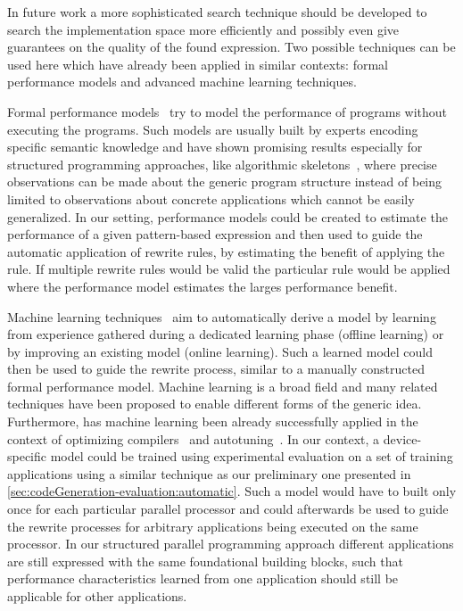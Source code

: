 In future work a more sophisticated search technique should be developed to search the implementation space more efficiently and possibly even give guarantees on the quality of the found expression.
Two possible techniques can be used here which have already been applied in similar contexts:
formal performance models and advanced machine learning techniques.

Formal performance models~\cite{} try to model the performance of programs without executing the programs.
Such models are usually built by experts encoding specific semantic knowledge and have shown promising results especially for structured programming approaches, like algorithmic skeletons~\cite{}, where precise observations can be made about the generic program structure instead of being limited to observations about concrete applications which cannot be easily generalized.
In our setting, performance models could be created to estimate the performance of a given pattern-based expression and then used to guide the automatic application of rewrite rules, by estimating the benefit of applying the rule.
If multiple rewrite rules would be valid the particular rule would be applied where the performance model estimates the larges performance benefit.

Machine learning techniques~\cite{} aim to automatically derive a model by learning from experience gathered during a dedicated learning phase (offline learning) or by improving an existing model (online learning).
Such a learned model could then be used to guide the rewrite process, similar to a manually constructed formal performance model.
Machine learning is a broad field and many related techniques have been proposed to enable different forms of the generic idea.
Furthermore, has machine learning been already successfully applied in the context of optimizing compilers~\cite{} and autotuning~\cite{}.
In our context, a device-specific model could be trained using experimental evaluation on a set of training applications using a similar technique as our preliminary one presented in \autoref{sec:codeGeneration-evaluation:automatic}.
Such a model would have to built only once for each particular parallel processor and could afterwards be used to guide the rewrite processes for arbitrary applications being executed on the same processor.
In our structured parallel programming approach different applications are still expressed with the same foundational building blocks, such that performance characteristics learned from one application should still be applicable for other applications.

